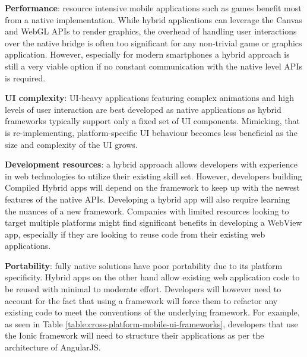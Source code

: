 \documentclass[thesis.tex]{subfiles}
\begin{document}
\begin{itemize}

	\begin{item}
	\textbf{Performance}: resource intensive mobile applications such as games benefit most from a native implementation. While hybrid applications can leverage the Canvas and WebGL APIs to render graphics, the overhead of handling user interactions over the native bridge is often too significant for any non-trivial game or graphics application. However, especially for modern smartphones a hybrid approach is still a very viable option if no constant communication with the native level APIs is required.
	\end{item}

	\begin{item}
	\textbf{UI complexity}: UI-heavy applications featuring complex animations and high levels of user interaction are best developed as native applications as hybrid frameworks typically support only a fixed set of UI components. Mimicking, that is re-implementing, platform-specific UI behaviour becomes less beneficial as the size and complexity of the UI grows.
	\end{item}

	\begin{item}
	\textbf{Development resources}: a hybrid approach allows developers with experience in web technologies to utilize their existing skill set. However, developers building Compiled Hybrid apps will depend on the framework to keep up with the newest features of the native APIs. Developing a hybrid app will also require learning the nuances of a new framework. Companies with limited resources looking to target multiple platforms might find significant benefits in developing a WebView app, especially if they are looking to reuse code from their existing web applications.
	\end{item}

	\begin{item}
	\textbf{Portability}: fully native solutions have poor portability due to its platform specificity. Hybrid apps on the other hand allow existing web application code to be reused with minimal to moderate effort. Developers will however need to account for the fact that using a framework will force them to refactor any existing code to meet the conventions of the underlying framework. For example, as seen in Table \ref{table:cross-platform-mobile-ui-frameworks}, developers that use the Ionic framework will need to structure their applications as per the architecture of AngularJS.
	\end{item}

\end{itemize}
\end{document}
